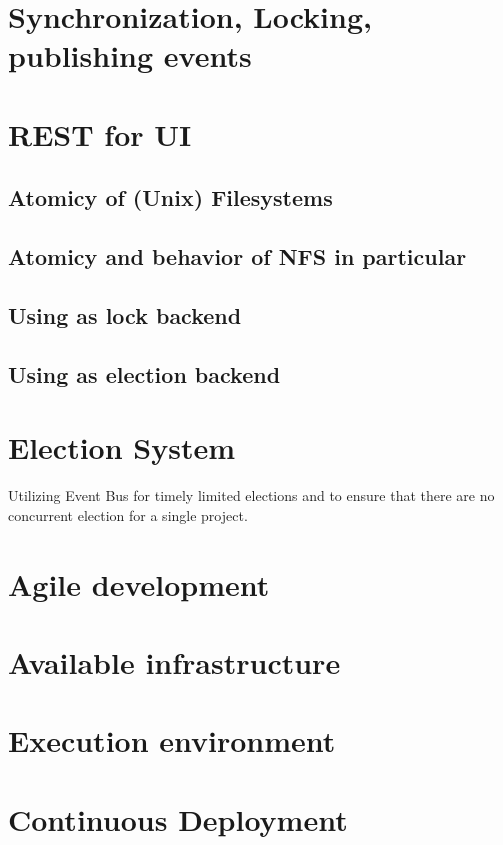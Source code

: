 \section{Synchronization, Locking, publishing events}

\section{REST for UI}



\subsection{Atomicy of (Unix) Filesystems}

\subsection{Atomicy and behavior of NFS in particular}

\subsection{Using as lock backend}

\subsection{Using as election backend}



\section{Election System}
\label{design:election}
\label{election:affinity_and_aversion} 


Utilizing Event Bus for timely limited elections and to ensure that there are no concurrent election for a single project.




\section{Agile development}

\section{Available infrastructure}

\section{Execution environment}

\section{Continuous Deployment}